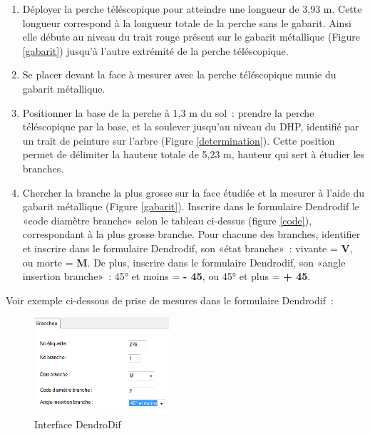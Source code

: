 \documentclass[letterpaper, 12pt]{article}
\begin{document}
\begin{onehalfspace}
\begin{enumerate}
\item Déployer la perche téléscopique pour atteindre une longueur de 3,93 m. Cette longueur correspond à la longueur totale de la perche sans le gabarit. Ainsi elle débute au niveau du trait rouge présent sur le gabarit métallique (Figure \ref{gabarit}) jusqu'à l'autre extrémité de la perche téléscopique.

\item Se placer devant la face à mesurer avec la perche téléscopique munie du gabarit métallique.

\item Positionner la base de la perche à  1,3 m du sol : prendre la perche téléscopique par la base, et la soulever jusqu'au niveau du DHP, identifié par un trait de peinture sur l'arbre (Figure \ref{determination}). Cette position permet de délimiter la hauteur totale de 5,23 m, hauteur qui sert à étudier les branches.

\item Chercher la branche la plus grosse sur la face étudiée et la mesurer à l’aide du gabarit métallique (Figure \ref{gabarit}). Inscrire dans le formulaire Dendrodif le «code diamètre branche» selon le tableau ci-dessus (figure \ref{code}), correspondant à la plus grosse branche. Pour chacune des branches, identifier et inscrire dans le formulaire Dendrodif, son «état branche» : vivante = \textbf{V}, ou morte = \textbf{M}.  De plus, inscrire dans le formulaire Dendrodif, son «angle insertion branche» : 45° et moins = \textbf{- 45}, ou 45° et plus = \textbf{+ 45}.

\end{enumerate}

\vspace{12pt}
 
Voir exemple ci-dessous de prise de mesures dans le formulaire Dendrodif :

\vspace{12pt}

\begin{figure}[H]
	\centering
	\includegraphics[width=5cm]{Figure3}
	\caption{Interface DendroDif}
\end{figure}


\end{onehalfspace}
\end{document}
